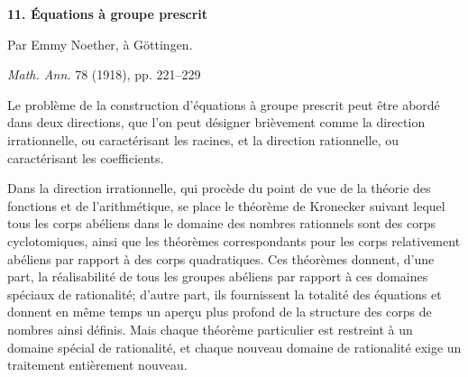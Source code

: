 \begin{center}
{\Large\bfseries 11. Équations à groupe prescrit}\par
\vspace{0.75em}
Par Emmy Noether, à Göttingen.\par
\vspace{1.5em}
\emph{Math. Ann.} 78 (1918), pp. 221--229
\end{center}

\vspace{1.5em}

Le problème de la construction d'équations à groupe prescrit peut être abordé dans deux directions, que l'on peut désigner brièvement comme la direction \og{}irrationnelle\fg{}, ou caractérisant les racines, et la direction \og{}rationnelle\fg{}, ou caractérisant les coefficients.

Dans la direction \og{}irrationnelle\fg{}, qui procède du point de vue de la théorie des fonctions et de l'arithmétique, se place le théorème de Kronecker suivant lequel tous les corps abéliens dans le domaine des nombres rationnels sont des corps cyclotomiques, ainsi que les théorèmes correspondants pour les corps relativement abéliens par rapport à des corps quadratiques. Ces théorèmes donnent, d'une part, la réalisabilité de tous les groupes abéliens par rapport à ces domaines spéciaux de rationalité; d'autre part, ils fournissent la totalité des équations et donnent en même temps un aperçu plus profond de la structure des corps de nombres ainsi définis. Mais chaque théorème particulier est restreint à un domaine spécial de rationalité, et chaque nouveau domaine de rationalité exige un traitement entièrement nouveau.

